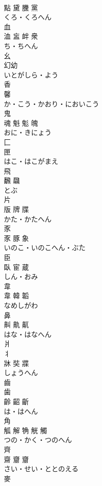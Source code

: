 \documentclass[8pt]{extreport}
\begin{document}
\begin{CJK}{UTF8}{min}
\\	點 黛 黱 黨	
\\	くろ・くろへん	
\\	血	
\\	洫 衁 衅 衆	
\\	ち・ちへん	
\\	幺	
\\	幻幼	
\\	いとがしら・よう	
\\	香	
\\	馨	
\\	か・こう・かおり・においこう	
\\	鬼	
\\	魂 魁 鬽 魄	
\\	おに・きにょう	
\\	匚	
\\	匣	
\\	はこ・はこがまえ	
\\	飛	
\\	飜 飝	
\\	とぶ	
\\	片	
\\	版 牌 牒	
\\	かた・かたへん	
\\	豕	
\\	豕 豚 象	
\\	いのこ・いのこへん・ぶた	
\\	臣	
\\	臥 宦 蔵	
\\	しん・おみ	
\\	韋	
\\	韋 韓 韜	
\\	なめしがわ	
\\	鼻	
\\	鼼 鼽 鼿	
\\	はな・はなへん	
\\	爿	
\\	丬 
\\	牀 奘 牃	
\\	しょうへん	
\\	齒	
\\	歯 
\\	齡 齠 齗	
\\	は・はへん	
\\	角	
\\	觚 解 觕 觥 觸	
\\	つの・かく・つのへん	
\\	齊	
\\	齋 齏 齏	
\\	さい・せい・ととのえる	
\\	麥	

\end{CJK}
\end{document}
